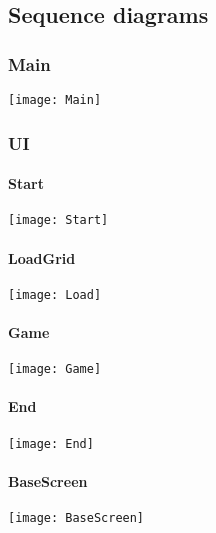 \subsection{Sequence diagrams}
    	\subsubsection{Main}
        \texttt{[image: Main]}
        \newpage
    	\subsubsection{UI}
            \paragraph{Start}
        		\texttt{[image: Start]}
                \newpage
            \paragraph{LoadGrid}
            	\texttt{[image: Load]}
                \newpage
            \paragraph{Game}
            	\texttt{[image: Game]}
                \newpage
            \paragraph{End}
            	\texttt{[image: End]}
                \newpage
            \paragraph{BaseScreen}
            	\texttt{[image: BaseScreen]}